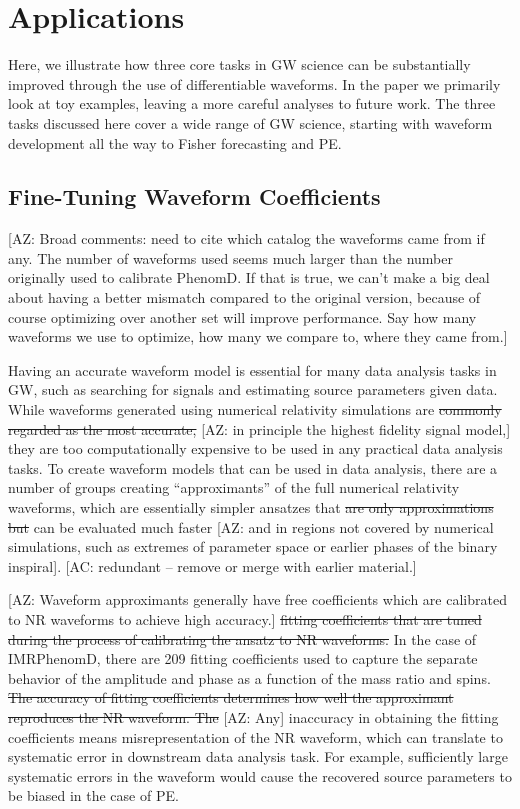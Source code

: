\documentclass[twocolumn]{aastex631}
\newcommand{\AZ}[1]{{\color{Burnt}[AZ: #1]}}
\newcommand{\amc}[1]{{\color{red}[AC: #1]}}
\begin{document}
\section{Applications}
\label{sec:applications}

Here, we illustrate how three core tasks in GW science can be substantially improved through the use of differentiable waveforms.
In the paper we primarily look at toy examples, leaving a more careful analyses to future work. 
The three tasks discussed here cover a wide range of GW science, starting with waveform development all the way to Fisher forecasting and PE.

\subsection{Fine-Tuning Waveform Coefficients}
\label{subsec:coeffs}

\AZ{Broad comments: need to cite which catalog the waveforms came from if any.
The number of waveforms used seems much larger than the number originally used
to calibrate PhenomD. 
If that is true, we can't make a big deal about having a better mismatch compared to
the original version, because of course optimizing over another set will improve 
performance.
Say how many waveforms we use to optimize, how many we compare to, where they came
from.}

Having an accurate waveform model is essential for many data analysis tasks in
GW, such as searching for signals and estimating source parameters given data.
While waveforms generated using numerical relativity simulations are \sout{commonly
regarded as the most accurate,} 
\AZ{in principle the highest fidelity signal model,}
they are too computationally expensive to be used
in any practical data analysis tasks. To create waveform models that can be used
in data analysis, there are a number of groups creating ``approximants'' of the
full numerical relativity waveforms, which are essentially simpler ansatzes that
\sout{are only approximations but} can be evaluated much faster \AZ{and in regions not
covered by numerical simulations, such as extremes of parameter space or earlier 
phases of the binary inspiral}. 
\amc{redundant -- remove or merge with earlier material.}

\AZ{Waveform approximants generally have free coefficients which are calibrated
to NR waveforms to achieve high accuracy.}
\sout{ fitting coefficients that are tuned during
the process of calibrating the ansatz to NR waveforms.} In the case of
IMRPhenomD, there are 209 fitting coefficients used to capture the separate
behavior of the amplitude and phase as a function of the mass ratio and spins.
\sout{The accuracy of fitting coefficients determines how well the approximant
reproduces the NR waveform. 
The}
\AZ{Any} inaccuracy in obtaining the fitting coefficients
means misrepresentation of the NR waveform, which can translate to systematic
error in downstream data analysis task. For example, sufficiently large
systematic errors in the waveform would cause the recovered source parameters to be biased
in the case of PE.
\end{document}
